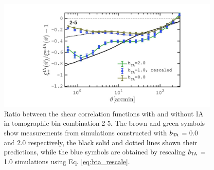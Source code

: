 \begin{figure}
\includegraphics[width=\columnwidth]{graphs/frac_xip_bta1_rescaled}
\caption{Ratio between the shear correlation functions with and without IA in tomographic bin combination 2-5.
The brown and green symbols show measurements from simulations constructed with $b_{\rm TA}$ = 0.0 and 2.0 respectively,  the black solid and dotted lines shown their predictions, while the blue symbols are obtained by rescaling $b_{\rm TA}$ = 1.0 simulations using Eq. \ref{eq:bta_rescale}.  }
\label{fig:xi_deltaNLA_rescaled}
\end{figure}